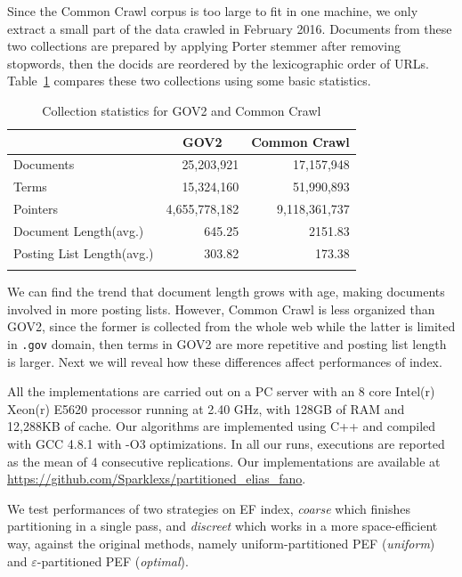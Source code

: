 \documentclass[runningheads,a4paper]{llncs}
\begin{document}
Since the Common Crawl corpus is too large to fit in one machine, we only extract a small part of the data crawled in February 2016.
Documents from these two collections are prepared by applying Porter stemmer after removing stopwords, then the docids are reordered by the lexicographic order of URLs.
Table~\ref{tab:collection statistics} compares these two collections using some basic statistics.

\begin{table}
	\centering
	\caption{Collection statistics for GOV2 and Common Crawl}
	\renewcommand{\arraystretch}{1.0}
	\begin{tabular}{l*{2}{r}}
		\toprule
		& \multicolumn{1}{c}{GOV2} & \multicolumn{1}{c}{Common Crawl} \\
		\midrule
		Documents & 25,203,921 & 17,157,948 \\
		Terms & 15,324,160 & 51,990,893 \\
		Pointers & 4,655,778,182 & 9,118,361,737 \\
		Document Length(avg.) & 645.25 & 2151.83 \\
		Posting List Length(avg.) & 303.82 & 173.38 \\
		\bottomrule
		\label{tab:collection statistics}
	\end{tabular}
\end{table}

We can find the trend that document length grows with age, making documents involved in more posting lists.
However, Common Crawl is less organized than GOV2, since the former is collected from the whole web while the latter is limited in \texttt{.gov} domain, then terms in GOV2 are more repetitive and posting list length is larger.
Next we will reveal how these differences affect performances of index.

All the implementations are carried out on a PC server with an 8 core Intel(r) Xeon(r) E5620 processor running at 2.40 GHz, with 128GB of RAM and 12,288KB of cache.
Our algorithms are implemented using C++ and compiled with GCC 4.8.1 with -O3 optimizations.
In all our runs, executions are reported as the mean of 4 consecutive replications.
Our implementations are available at \url{https://github.com/Sparklexs/partitioned_elias_fano}.

We test performances of two strategies on EF index, \textit{coarse} which finishes partitioning in a single pass, and \textit{discreet} which works in a more space-efficient way, against the original methods, namely uniform-partitioned PEF (\textit{uniform}) and $\varepsilon$-partitioned PEF (\textit{optimal}).
\end{document}
